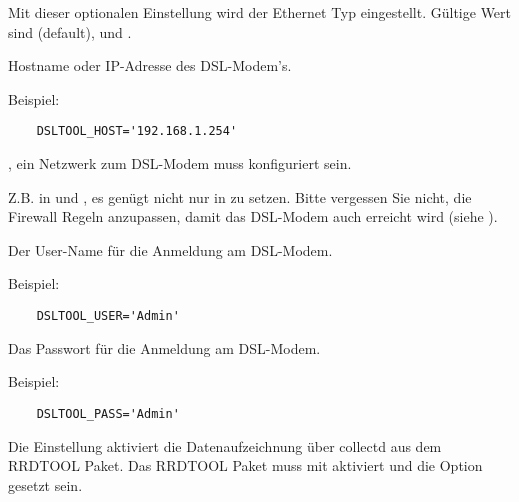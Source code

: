 \begin{description}

  Mit dieser optionalen Einstellung wird der Ethernet Typ eingestellt.
  Gültige Wert sind  (default),  und .


  Hostname oder IP-Adresse des DSL-Modem's.

  Beispiel:

\begin{example}
\begin{verbatim}
    DSLTOOL_HOST='192.168.1.254'
\end{verbatim}
\end{example}

  , ein Netzwerk zum DSL-Modem muss konfiguriert sein.

  Z.B. in   und
  ,
  es genügt nicht nur  in  zu setzen.
  Bitte vergessen Sie nicht, die Firewall Regeln anzupassen, damit das DSL-Modem
  auch erreicht wird (siehe ).


  Der User-Name für die Anmeldung am DSL-Modem.

  Beispiel:

\begin{example}
\begin{verbatim}
    DSLTOOL_USER='Admin'
\end{verbatim}
\end{example}


  Das Passwort für die Anmeldung am DSL-Modem.

  Beispiel:

\begin{example}
\begin{verbatim}
    DSLTOOL_PASS='Admin'
\end{verbatim}
\end{example}


  Die Einstellung  aktiviert die Datenaufzeichnung über collectd
  aus dem RRDTOOL Paket.
  Das RRDTOOL Paket muss mit  aktiviert und
  die Option  gesetzt sein.


\end{description}
